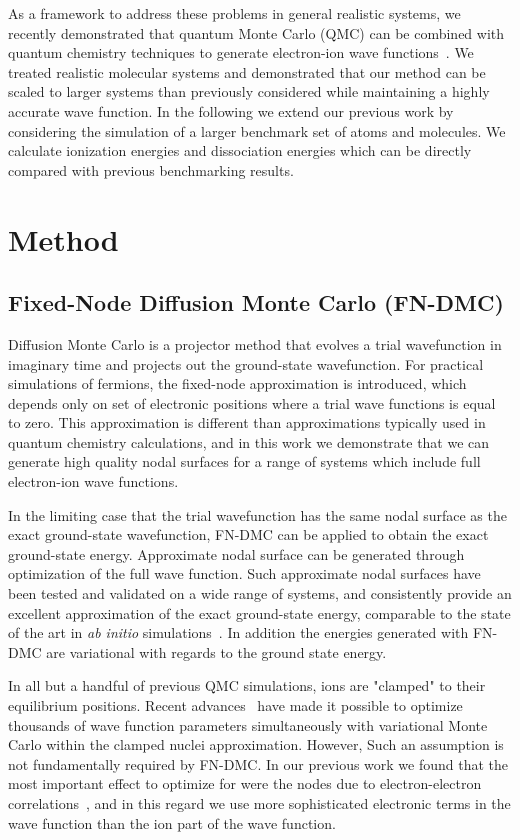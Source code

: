 \documentclass[pra,superscriptaddress,groupedaddress,twocolumn]{revtex4}
\begin{document}
As a framework to address these problems in general realistic systems, we recently demonstrated that quantum Monte Carlo (QMC) can be combined with quantum chemistry techniques to generate electron-ion wave functions~\cite{Tubman_ECG}.  We treated realistic molecular systems and demonstrated that our method can be scaled to larger systems than previously considered while maintaining a highly accurate wave function. In the following we extend our previous work by considering the simulation of a larger benchmark set of atoms and molecules.  We calculate ionization energies and dissociation energies which can be directly compared with previous benchmarking results.

\section{Method}
\subsection{Fixed-Node Diffusion Monte Carlo (FN-DMC)}
Diffusion Monte Carlo is a projector method that evolves a trial wavefunction in imaginary time and projects out the ground-state wavefunction.  For practical simulations of fermions, the fixed-node approximation is introduced, which depends only on set of electronic positions where a trial wave functions is equal to zero.  This approximation is different than approximations typically used in quantum chemistry calculations, and in this work we demonstrate that we can generate high quality nodal surfaces for a range of systems which include full electron-ion wave functions. 

In the limiting case that the trial wavefunction has the same nodal surface as the exact ground-state wavefunction, FN-DMC can be applied to obtain the exact ground-state energy.  Approximate nodal surface can be generated through optimization of the full wave function. Such approximate nodal surfaces have been tested and validated on a wide range of systems, and consistently provide an excellent approximation of the exact ground-state energy,  comparable to the state of the art in \textit{ab initio} simulations~\cite{grossman1}. In addition the energies generated with FN-DMC are variational with regards to the ground state energy.

In all but a handful of previous QMC simulations, ions are "clamped" to their equilibrium positions. Recent advances~\cite{Nightingale_Linear,Umrigar_Linear,Brown_Bench} have made it possible to optimize thousands of wave function parameters simultaneously with variational Monte Carlo within the clamped nuclei approximation. However, Such an assumption is not fundamentally required by FN-DMC.  In our previous work we found that the most important effect to optimize for were the nodes due to electron-electron correlations~\cite{Tubman_ECG}, and in this regard we use more sophisticated electronic terms in the wave function than the ion part of the wave function.
\end{document}

